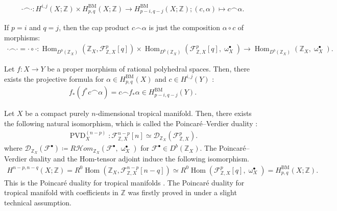 \documentclass[a4paper,dvipdfmx,reqno,12pt]{amsart}
\theoremstyle{definition}
\newcommand{\deq}{\coloneqq}
\newcommand{\opn}[1]{\operatorname{#1}}
\numberwithin{equation}{section}
\begin{document}
\begin{align}
\cdot \frown \cdot \colon
H^{i,j}(X;\mathbb{Z}) \times 
H_{p,q}^{\opn{BM}}(X;\mathbb{Z})\to 
H_{p-i,q-j}^{\opn{BM}}(X;\mathbb{Z});(c,\alpha) 
\mapsto c\frown \alpha.
\end{align}

If $p=i$ and $q=j$, then the cap product $c\frown \alpha$ 
is just the composition $\alpha \circ c$ of 
morphisms:
\begin{align} \label{equation-composition-cap}
\cdot \frown \cdot =\cdot \circ \cdot \colon
\opn{Hom}_{D^{b}(\mathbb{Z}_X)}(
\mathbb{Z}_X,\mathcal{F}^{p}_{\mathbb{Z},X}[q])\times
\opn{Hom}_{D^{b}(\mathbb{Z}_X)}
(\mathcal{F}^{p}_{\mathbb{Z},X}[q],\upomega_X^{\bullet})
\to 
\opn{Hom}_{D^{b}(\mathbb{Z}_X)}(\mathbb{Z}_X,
\upomega_X^{\bullet}).
\end{align}

Let $f\colon X \to Y $ be a proper morphism of 
rational polyhedral spaces.
Then, there exists the projective formula 
for $\alpha\in H_{p,q}^{\mathrm{BM}}(X)$
and $c\in H^{i,j}(Y)$ 
\cite[Proposition 4.18]{gross2019sheaftheoretic}:
\begin{align}
  f_*(f^{*}c\frown \alpha)=
c\frown f_*\alpha\in H_{p-i,q-j}^{\opn{BM}}(Y).
\end{align}



Let $X$ be a compact
purely $n$-dimensional tropical manifold.
Then, there exists the following natural isomorphism, 
which is called the Poincar\'e--Verdier duality 
\cite[Theorem 6.2]{gross2019sheaftheoretic}:
\begin{align}
\opn{PVD}^{(n-p)}_X\colon \mathcal{F}_{\mathbb{Z},X}^{n-p}[n]
\simeq 
\mathcal{D}_{\mathbb{Z}_X}(\mathcal{F}_{\mathbb{Z},X}^{p}).
\end{align}
where $\mathcal{D}_{\mathbb{Z}_X}(\mathcal{F}^{\bullet})
\deq R\mathcal{H}om_{\mathbb{Z}_X}(\mathcal{F}^{\bullet}
,\upomega^{\bullet}_X)$ for 
$\mathcal{F}^{\bullet}\in D^{b}(\mathbb{Z}_X)$.
The Poincar\'e--Verdier duality and the 
Hom-tensor adjoint induce
the following isomorphism.
\begin{align}
H^{n-p,n-q}(X;\mathbb{Z})=
R^{0}\opn{Hom}(\mathbb{Z}_X,
\mathcal{F}_{\mathbb{Z},X}^{n-p}[n-q])\simeq 
R^{0}\opn{Hom}(\mathcal{F}_{\mathbb{Z},X}^{p}[q],
\upomega_{X}^{\bullet})=
H_{p,q}^{\mathrm{BM}}(X;\mathbb{Z}).
\end{align}
This is the Poincar\'e duality
for tropical manifolds 
\cite[Corollary 6.3]{gross2019sheaftheoretic}.
The Poincar\'e duality for tropical manifold
with coefficients in $\mathbb{Z}$ was firstly 
proved in \cite[Theorem 5.3]{MR3894860}
under a slight technical assumption.
\end{document}
